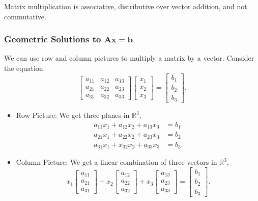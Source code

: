 \documentclass[11pt]{scrartcl}
\theoremstyle{plain}
\theoremstyle{definition}
\theoremstyle{remark}
\begin{document}
Matrix multiplication is associative, distributive over vector addition, and not commutative. 

\subsubsection{Geometric Solutions to $\mathbf{A}\mathbf{x}=\mathbf{b}$}

We can use row and column pictures to multiply a matrix by a vector. Consider the equation
\[ \begin{bmatrix}a_{11} & a_{12} & a_{13} \\ a_{21} & a_{22} & a_{23} \\ a_{31} & a_{32} & a_{33}\end{bmatrix}
\begin{bmatrix}x_{1} \\ x_{2} \\ x_{3}\end{bmatrix}=\begin{bmatrix}b_{1} \\ b_{2} \\ b_{3}\end{bmatrix}. \]

\begin{itemize}
    \item Row Picture: We get three planes in $\mathbb{R}^{3}$,
    \[ \begin{aligned} a_{11}x_{1}+a_{12}x_{2}+a_{13}x_{3}&=b_{1} \\ a_{21}x_{1}+a_{22}x_{2}+a_{23}x_{3}&=b_{2} \\ 
    a_{31}x_{1}+x_{32}x_{2}+a_{33}x_{3}&=b_{3}. \end{aligned} \]
    \item Column Picture: We get a linear combination of three vectors in $\mathbb{R}^{3}$,
    \[ x_{1}\begin{bmatrix}a_{11} \\ a_{21} \\ a_{31}\end{bmatrix} + x_{2}\begin{bmatrix}a_{12} \\ a_{22} \\ a_{32}
    \end{bmatrix} + x_{3}\begin{bmatrix}a_{13} \\ a_{23} \\ a_{33}\end{bmatrix} = \begin{bmatrix}b_{1} \\ b_{2} \\ 
    b_{3}\end{bmatrix}. \]
\end{itemize}
\end{document}
